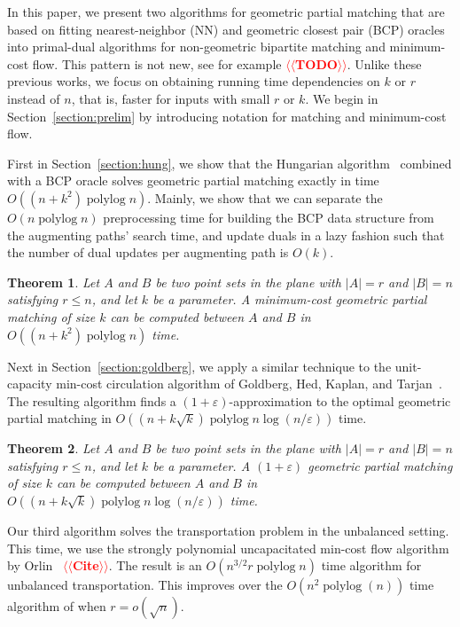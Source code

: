 \documentclass[11pt]{article}
\makeatletter
\def\polylog{\mathop{\mathrm{polylog}}}
\def\eps{\varepsilon}
\theoremstyle{plain}
\newtheorem{theorem}{Theorem}
\def\n@te#1{\textsf{\boldmath \textbf{$\langle\!\langle$#1$\rangle\!\rangle$}}\leavevmode}
\def\note#1{\textcolor{red}{\n@te{#1}}}
\makeatother
\begin{document}
In this paper, we present two algorithms for geometric partial matching
that are based on fitting nearest-neighbor (NN) and geometric closest pair
(BCP) oracles into primal-dual algorithms for non-geometric bipartite matching
and minimum-cost flow.
This pattern is not new, see for example \note{TODO}.
Unlike these previous works, we focus on obtaining running time dependencies on
$k$ or $r$ instead of $n$, that is, faster for inputs with small $r$ or $k$.
We begin in Section~\ref{section:prelim} by introducing notation for matching
and minimum-cost flow.


First in Section~\ref{section:hung}, we show that the Hungarian algorithm~\cite{Kuhn55}
combined with a BCP oracle solves geometric partial matching exactly in time
$O((n + k^2)\polylog n)$.
Mainly, we show that we can separate the $O(n\polylog n)$ preprocessing time
for building the BCP data structure from the augmenting paths' search time,
and update duals in a lazy fashion such that the number of dual updates per
augmenting path is $O(k)$.

\begin{theorem}
\label{theorem:hung}
Let $A$ and $B$ be two point sets in the plane with $|A| = r$ and $|B| = n$ satisfying $r \le n$, and let $k$ be a
parameter.  A minimum-cost geometric partial matching of size $k$
can be computed between $A$ and $B$ in $O((n + k^2)\polylog n)$ time.
\end{theorem}


Next in Section~\ref{section:goldberg}, we apply a similar technique to the unit-capacity min-cost circulation
algorithm of Goldberg, Hed, Kaplan, and Tarjan~\cite{GHKT17}.
The resulting algorithm finds a $(1 + \eps)$-approximation to the optimal
geometric partial matching in $O((n + k\sqrt{k})\polylog n \log(n/\eps))$
time.

\begin{theorem}
\label{theorem:gmcm}
Let $A$ and $B$ be two point sets in the plane with $|A| = r$ and $|B| = n$ satisfying $r \le n$, and let $k$ be a
parameter.
A $(1+\eps)$ geometric partial matching of size $k$
can be computed between $A$ and $B$ in
$O((n + k\sqrt{k})\polylog n \log(n/\eps))$ time.
\end{theorem}


Our third algorithm solves the transportation problem in the unbalanced
setting.
This time, we use the strongly polynomial uncapacitated min-cost flow algorithm
by Orlin~\cite{xxx} \note{Cite}.
The result is an $O(n^{3/2} r \polylog n)$ time algorithm for unbalanced
transportation.
This improves over the $O(n^2 \polylog(n))$ time algorithm of %
when $r = o(\sqrt{n})$.
\end{document}
